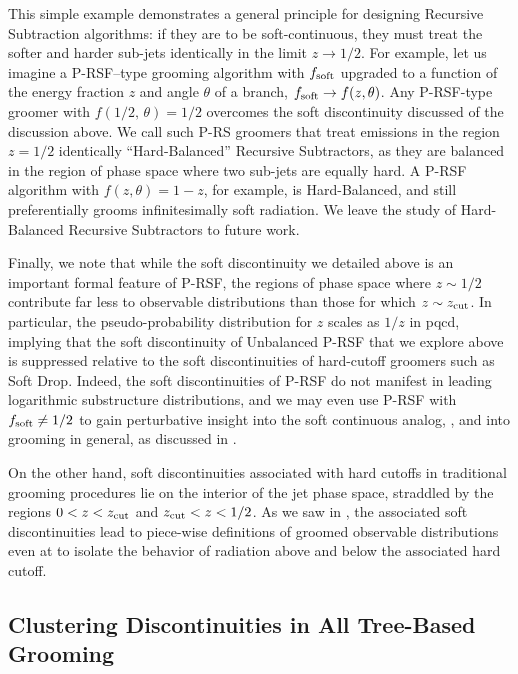 This simple example demonstrates a general principle for designing Recursive Subtraction algorithms:
%
if they are to be soft-continuous, they must treat the softer and harder sub-jets identically in the limit \(z \to 1/2\).
%
For example, let us imagine a P-RSF--type grooming algorithm with \(f_{\rm soft}\) upgraded to a function of the energy fraction \(z\) and angle \(\theta\) of a branch, \(f_{\rm soft} \to f(z,\theta)\).
%
Any P-RSF-type groomer with \(f(1/2,\, \theta) = 1/2\) overcomes the soft discontinuity discussed of the discussion above.
%
We call such P-RS groomers that treat emissions in the region \(z = 1/2\) identically ``Hard-Balanced'' Recursive Subtractors, as they are balanced in the region of phase space where two sub-jets are equally hard.
%
A P-RSF algorithm with \(f(z, \theta) = 1 - z\), for example, is Hard-Balanced, and still preferentially grooms infinitesimally soft radiation.
%
We leave the study of Hard-Balanced Recursive Subtractors to future work.

Finally, we note that while the soft discontinuity we detailed above is an important formal feature of P-RSF, the regions of phase space where \(z \sim 1/2\) contribute far less to observable distributions than those for which \(z \sim z_{\rm cut}\).
%
In particular, the pseudo-probability distribution for \(z\) scales as \(1/z\) in \gls{pqcd}, implying that the soft discontinuity of Unbalanced P-RSF that we explore above is suppressed relative to the soft discontinuities of hard-cutoff groomers such as Soft Drop.
%
Indeed, the soft discontinuities of P-RSF do not manifest in leading logarithmic substructure distributions, and we may even use P-RSF with \(f_{\rm soft} \neq 1/2\) to gain perturbative insight into the soft continuous analog, , and into \PIRANHA{} grooming in general, as discussed in .

On the other hand, soft discontinuities associated with hard cutoffs in traditional grooming procedures lie on the interior of the jet phase space, straddled by the regions \(0 < z < z_{\rm cut}\) and \(z_{\rm cut} < z < 1/2\).
%
As we saw in , the associated soft discontinuities lead to piece-wise definitions of groomed observable distributions even at  to isolate the behavior of radiation above and below the associated hard cutoff.

\subsection{Clustering Discontinuities in All Tree-Based Grooming}
\label{sec:ang_discont}

